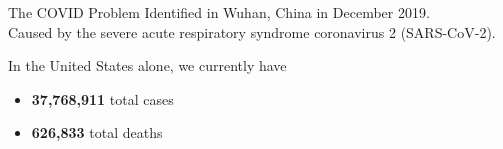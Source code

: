 \begin{slide}{The COVID Problem}
	Identified in Wuhan, China in December 2019. \\
	
	Caused by the severe acute respiratory syndrome coronavirus 2 (SARS-CoV-2). 
	
	\vspace{1cm}
	
	In the United States alone, we currently have
	\begin{itemize}
		\item \textbf{37,768,911} total cases
		\item \textbf{626,833} total deaths
	\end{itemize}
\end{slide}
